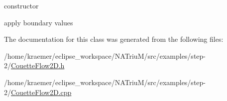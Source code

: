 constructor 

apply boundary values 

The documentation for this class was generated from the following files\-:\begin{DoxyCompactItemize}
\item 
/home/kraemer/eclipse\-\_\-workspace/\-N\-A\-Triu\-M/src/examples/step-\/2/\hyperlink{CouetteFlow2D_8h}{Couette\-Flow2\-D.\-h}\item 
/home/kraemer/eclipse\-\_\-workspace/\-N\-A\-Triu\-M/src/examples/step-\/2/\hyperlink{CouetteFlow2D_8cpp}{Couette\-Flow2\-D.\-cpp}\end{DoxyCompactItemize}
